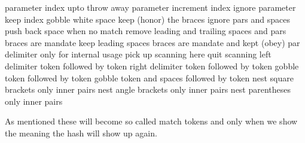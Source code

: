 \starttabulate[|c|||]
\NC {} \NC parameter                                   \NC index  upto  \NC \NR
\TB
\NC {} \NC throw away parameter                        \NC increment index              \NC \NR
\NC \type{#-} \NC ignore parameter                            \NC keep index                   \NC \NR
\TB
\NC \type{#*} \NC gobble white space                          \NC                              \NC \NR
\NC \type{#+} \NC keep (honor) the braces                     \NC                              \NC \NR
\NC {} \NC ignore pars and spaces                      \NC                              \NC \NR
\NC \type{#,} \NC push back space when no match               \NC                              \NC \NR
\NC \type{#/} \NC remove leading and trailing spaces and pars \NC                              \NC \NR
\NC \type{#=} \NC braces are mandate                          \NC                              \NC \NR
\NC \type{#^} \NC keep leading spaces                         \NC                              \NC \NR
\NC \type{#_} \NC braces are mandate and kept (obey)          \NC                              \NC \NR
\TB
\NC {} \NC par delimiter                               \NC only for internal usage      \NC \NR
\TB
\NC \type{#:} \NC pick up scanning here                       \NC                              \NC \NR
\NC \type{#;} \NC quit scanning                               \NC                              \NC \NR
\TB
\NC {} \NC left delimiter token                        \NC followed by token            \NC \NR
\NC {} \NC right delimiter token                       \NC followed by token            \NC \NR
\TB
\NC {} \NC gobble token                                \NC followed by token            \NC \NR
\NC {} \NC gobble token and spaces                     \NC followed by token            \NC \NR
\TB
\NC {} \NC nest square brackets                        \NC only inner pairs             \NC \NR
\NC {} \NC nest angle brackets                         \NC only inner pairs             \NC \NR
\NC {} \NC nest parentheses                            \NC only inner pairs             \NC \NR
\stoptabulate

As mentioned these will become so called match tokens and only when we show the
meaning the hash will show up again.

\startbuffer
\def\test[#1]#*[*S#2]{.#1.#2.}
\stopbuffer

\typebuffer \getbuffer

\startlines \tt
\luatokentable\test
\stoplines

